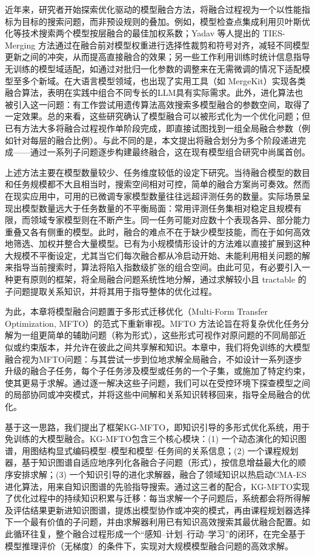 \documentclass[../main.tex]{subfiles}
\begin{document}
近年来，研究者开始探索优化驱动的模型融合方法，将融合过程视为一个以性能指标为目标的搜索问题，而非预设规则的叠加。例如，模型检查点集成利用贝叶斯优化等技术搜索两个模型按层融合的最佳加权系数；Yadav 等人提出的 TIES-Merging 方法通过在融合前对模型权重进行选择性裁剪和符号对齐，减轻不同模型更新之间的冲突，从而提高直接融合的效果；另一些工作利用训练时统计信息指导无训练的模型域适配，如通过对批归一化参数的调整来在无需微调的情况下适配模型至多个新域。在大语言模型领域，也出现了实用工具（如 MergeKit）实现各类融合算法，表明在实践中组合不同专长的LLM具有实际需求。此外，进化算法也被引入这一问题：有工作尝试用遗传算法高效搜索多模型融合的参数空间，取得了一定效果。总的来看，这些研究确认了模型融合可以被形式化为一个优化问题；但已有方法大多将融合过程视作单阶段完成，即直接试图找到一组全局融合参数（例如针对每层的融合比例）。与此不同的是，本文提出将融合划分为多个阶段递进完成——通过一系列子问题逐步构建最终融合，这在现有模型组合研究中尚属首创。

上述方法主要在模型数量较少、任务维度较低的设定下研究。当待融合模型的数目和任务规模都不大且相当时，搜索空间相对可控，简单的融合方案尚可奏效。然而在现实应用中，可用的已微调专家模型数量往往远超评测任务的数量。实际场景呈现出模型数量远大于任务数量的不平衡局面：常用评测任务集相对稳定且规模有限，而领域专家模型则在不断产生。同一任务可能对应数十个表现各异、部分能力重叠又各有侧重的模型。此时，融合的难点不在于缺少模型技能，而在于如何高效地筛选、加权并整合大量模型。已有为小规模情形设计的方法难以直接扩展到这种大规模不平衡设定，尤其当它们每次融合都从冷启动开始、未能利用相关问题的解来指导当前搜索时，算法将陷入指数级扩张的组合空间。由此可见，有必要引入一种更有原则的框架，将全局融合问题系统性地分解，通过求解较小且 tractable 的子问题提取关系知识，并将其用于指导整体的优化过程。

为此，本章将模型融合问题置于多形式迁移优化（Multi-Form Transfer Optimization, MFTO）的范式下重新审视。MFTO 方法论旨在将复杂优化任务分解为一组更简单的辅助问题（称为形式），这些形式可视作对原问题的不同局部近似或约束版本，并允许在彼此之间共享解和知识。本章中，我们将免训练的大模型融合视为MFTO问题：与其尝试一步到位地求解全局融合，不如设计一系列逐步升级的融合子任务，每个子任务涉及模型或任务的一个子集，或施加了特定约束，使其更易于求解。通过逐一解决这些子问题，我们可以在受控环境下探查模型之间的局部协同或冲突模式，并将这些中间解和关系知识转移回来，指导全局融合的优化。

基于这一思路，我们提出了框架KG-MFTO，即知识引导的多形式优化系统，用于免训练的大模型融合。KG-MFTO包含三个核心模块：(1) 一个动态演化的知识图谱，用图结构显式编码模型–模型和模型–任务间的关系信息；(2) 一个课程规划器，基于知识图谱自适应地序列化各融合子问题（形式），按信息增益最大化的顺序安排求解；(3) 一个知识引导的进化求解器，融合了领域知识以热启动CMA-ES进化算法，用来自知识图谱的先验指导搜索。通过这三者的配合，KG-MFTO实现了优化过程中的持续知识积累与迁移：每当求解一个子问题后，系统都会将所得解及评估结果更新进知识图谱，提炼出模型协作或冲突的模式，再由课程规划器选择下一个最有价值的子问题，并由求解器利用已有知识高效搜索其最优融合配置。如此循环往复，整个融合过程形成一个“感知–计划–行动–学习”的闭环，在完全基于模型推理评价（无梯度）的条件下，实现对大规模模型融合问题的高效求解。
\end{document}
